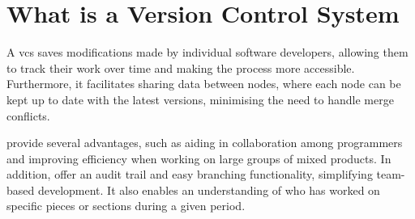 %
%
%
%
%
%
\section{What is a Version Control System}
A \acrfull{vcs} saves modifications made by individual software developers, allowing them to track their work over time and making the process more accessible. Furthermore, it facilitates sharing data between nodes, where each node can be kept up to date with the latest versions, minimising the need to handle merge conflicts.
\smallskip

 provide several advantages, such as aiding in collaboration among programmers and improving efficiency when working on large groups of mixed products. In addition,  offer an audit trail and easy branching functionality, simplifying team-based development. It also enables an understanding of who has worked on specific pieces or sections during a given period.
\smallskip

